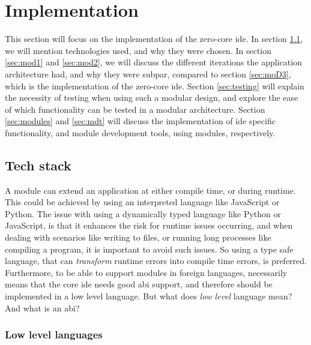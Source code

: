 \chapter{Implementation} \label{cha:impl}

This section will focus on the implementation of the zero-core \gls*{ide}. In
section \ref{sec:stack}, we will mention technologies used, and why they were
chosen. In section \ref{sec:mod1} and \ref{sec:mod2}, we will discuss the
different iterations the application architecture had, and why they were subpar,
compared to section \ref{sec:moD3}, which is the implementation of the zero-core
\gls*{ide}. Section \ref{sec:testing} will explain the necessity of testing when
using such a modular design, and explore the ease of which functionality can be
tested in a modular architecture. Section \ref{sec:modules} and \ref{sec:mdt}
will discuss the implementation of \gls{ide} specific functionality, and
module development tools, using modules, respectively.

\section{Tech stack} \label{sec:stack}

A module can extend an application at either compile time, or during runtime.
This could be achieved by using an interpreted language like JavaScript or
Python. The issue with using a dynamically typed language like Python or
JavaScript, is that it enhances the risk for runtime issues occurring, and when
dealing with scenarios like writing to files, or running long processes like
compiling a program, it is important to avoid such issues. So using a type safe
language, that can \textit{transform} runtime errors into compile time errors,
is preferred. Furthermore, to be able to support modules in foreign languages,
necessarily means that the core \gls*{ide} needs good \gls*{abi} support, and
therefore should be implemented in a low level language. But what does
\textit{low level} language mean? And what is an \gls*{abi}?


\subsection{Low level languages}

